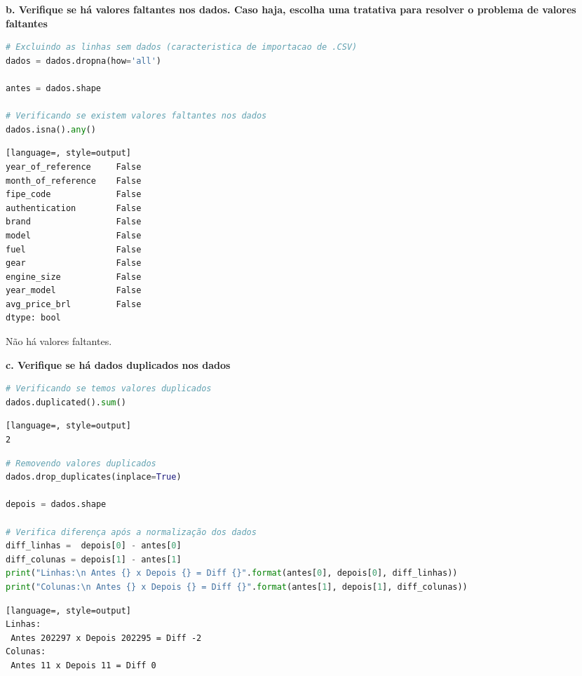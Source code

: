 \begin{adjustwidth}{1em}{}
\textbf{b. Verifique se há valores faltantes nos dados. Caso haja, escolha uma tratativa para resolver o problema de valores faltantes}
\end{adjustwidth}

\begin{lstlisting}[language=Python, style=input]
# Excluindo as linhas sem dados (caracteristica de importacao de .CSV)
dados = dados.dropna(how='all')

antes = dados.shape

# Verificando se existem valores faltantes nos dados 
dados.isna().any()
\end{lstlisting}
\begin{lstlisting}[language=, style=output]
year_of_reference     False
month_of_reference    False
fipe_code             False
authentication        False
brand                 False
model                 False
fuel                  False
gear                  False
engine_size           False
year_model            False
avg_price_brl         False
dtype: bool
\end{lstlisting}
Não há valores faltantes.


\begin{adjustwidth}{1em}{}
\textbf{c. Verifique se há dados duplicados nos dados}
\end{adjustwidth}


\begin{lstlisting}[language=Python, style=input]
# Verificando se temos valores duplicados
dados.duplicated().sum() 
\end{lstlisting}
\begin{lstlisting}[language=, style=output]
2
\end{lstlisting}

\begin{lstlisting}[language=Python, style=input]
# Removendo valores duplicados
dados.drop_duplicates(inplace=True)

depois = dados.shape

# Verifica diferença após a normalização dos dados
diff_linhas =  depois[0] - antes[0]
diff_colunas = depois[1] - antes[1]
print("Linhas:\n Antes {} x Depois {} = Diff {}".format(antes[0], depois[0], diff_linhas))
print("Colunas:\n Antes {} x Depois {} = Diff {}".format(antes[1], depois[1], diff_colunas))
\end{lstlisting}
\begin{lstlisting}[language=, style=output]
Linhas:
 Antes 202297 x Depois 202295 = Diff -2
Colunas:
 Antes 11 x Depois 11 = Diff 0
\end{lstlisting}

